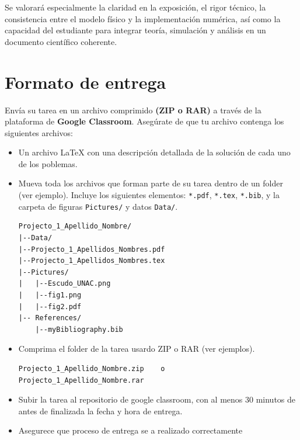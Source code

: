 \documentclass[a4paper,10pt]{exam}
\begin{document}
\bigskip

Se valorará especialmente la claridad en la exposición, el rigor técnico, la consistencia entre el modelo físico y la implementación numérica, así como la capacidad del estudiante para integrar teoría, simulación y análisis en un documento científico coherente.

\section*{Formato de entrega}
Envía su tarea en un archivo comprimido \textbf{(ZIP o RAR)} a través de la plataforma de \textbf{Google Classroom}. Asegúrate de que tu archivo contenga los siguientes archivos:  
\begin{itemize}
\item Un archivo \LaTeX\;  con una descripción detallada de la solución de cada uno de los poblemas. 
\item Mueva toda los archivos que forman parte de su tarea dentro de un folder (ver ejemplo). Incluye los siguientes elementos: \texttt{*.pdf}, \texttt{*.tex}, \texttt{*.bib}, y la carpeta de figuras \verb+Pictures/+ y datos \verb+Data/+.
\begin{verbatim}
Projecto_1_Apellido_Nombre/
|--Data/
|--Projecto_1_Apellidos_Nombres.pdf
|--Projecto_1_Apellidos_Nombres.tex
|--Pictures/
|   |--Escudo_UNAC.png
|   |--fig1.png
|   |--fig2.pdf
|-- References/
    |--myBibliography.bib
\end{verbatim}

\item Comprima el folder de la tarea usardo ZIP o RAR (ver ejemplos).
\begin{verbatim}
Projecto_1_Apellido_Nombre.zip    o     Projecto_1_Apellido_Nombre.rar
\end{verbatim}
\item Subir la tarea al repositorio de google classroom, con al menos 30 minutos de antes de finalizada la fecha y hora de entrega.  
\item Asegurece que proceso de entrega se a realizado correctamente
\end{itemize}
\end{document}
